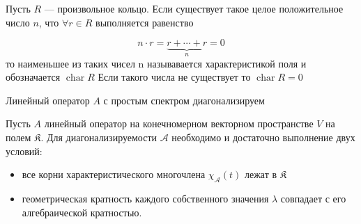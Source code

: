 \begin{definition}
	Пусть $R$ — произвольное кольцо. Если существует такое целое положительное число $n$, что $\forall r\in R$ выполняется равенство
	
	$$
	n\cdot r=\underbrace{r+\cdots +r}_{n} = 0
	$$
	то наименьшее из таких чисел n называвается характеристикой поля и обозначается $ {\mathop  {{\mathrm  {char}}}}R$
	Если такого числа не существует то $ {\mathop  {{\mathrm  {char}}}}R = 0$
\end{definition}

\begin{theorem}
	\label{thm:thm1}
	Линейный оператор $ A $ с простым спектром диагонализируем
\end{theorem}

\begin{theorem}
	\label{thm:thm2}
	Пусть $ A $ линейный оператор на конечномерном векторном пространстве $ V $ на полем $\mathfrak{K}$. Для диагонализируемости $ \mathcal{A} $ необходимо и достаточно выполнение двух условий:
	\begin{itemize}
		\item все корни характеристического многочлена $\chi_{\mathcal{A}}(t)$ лежат в $ \mathfrak{K} $
		\item 
		геометрическая кратность каждого собственного значения  $ \lambda $ совпадает с его алгебраической кратностью.  
	\end{itemize}
\end{theorem}